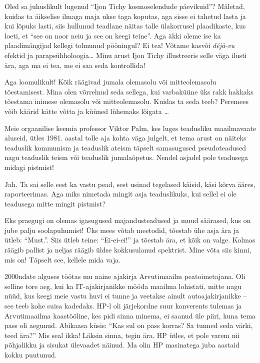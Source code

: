 Oled sa juhuslikult lugenud \enquote{Ijon Tichy kosmoselendude 
päevikuid}? Mäletad, 
kuidas ta äikselise ilmaga maja ukse taga koputas, aga sisse ei tahetud lasta ja kui 
lõpuks lasti, siis hullunud teadlane näitas talle ülakorrusel 
plaadikaste, kus loeti, et \enquote{see on noor neiu ja see on keegi teine}. 
Aga äkki oleme ise ka plaadimängijad kellegi tolmunud pööningul? Ei tea! Võtame kasvõi
\emph{déjà-vu} efektid ja parapsühholoogia\ldots{ }Minu arust Ijon Tichy illustreeris selle väga ilusti 
ära, aga ma ei tea, me ei saa seda kontrollida! 


Aga loomulikult! Kõik räägivad jumala olemasolu või
mitteolemasolu tõestamisest. Mina olen võrrelnud seda sellega, kui varbaküüne 
üks rakk hakkaks tõestama inimese olemasolu või mitteolemasolu. Kuidas ta seda 
teeb? Peremees võib käärid kätte võtta ja küüned lühemaks lõigata \ldots

Meie orgaanilise keemia professor Viktor Palm, kes
luges teadusliku maailmavaate aluseid, ütles 1981. aastal tolle aja kohta väga julgelt, et tema arust on näiteks teaduslik kommunism ja teaduslik 
ateism täpselt samasugused pseudoteadused nagu teaduslik teism või teaduslik 
jumalaõpetus. Nendel asjadel pole teadusega midagi pistmist!


Jah. Ta sai selle eest ka vastu pead, sest usinad tegelased käisid, käsi kõrva ääres, raporteerimas. Aga miks nimetada mingit asja 
teaduslikuks, kui sellel ei ole teadusega mitte mingit pistmist?


Eks praegugi on olemas igasugused majandusteadused ja muud säärased, kus on
jube palju soolapuhumist! Üks mees võtab meetodid, tõestab ühe 
asja ära ja ütleb: \enquote{Must.}. Siis ütleb teine: \enquote{Ei-ei-ei!} ja tõestab 
ära, et kõik on valge. Kolmas räägib pallist ja neljas räägib üldse kokkusulanud spektrist. Mine võta siis kinni, mis on! Täpselt see, kellele mida vaja.


2000ndate alguses töötas mu naine ajakirja 
Arvutimaailm peatoimetajana. Oli selline tore aeg, kui 
ka IT-ajakirjanikke mööda maailma lohistati, mitte nagu nüüd, kus keegi meie 
vastu huvi ei tunne ja veetakse ainult autoajakirjanikke -- see teeb kohe suisa 
kadedaks. HP-l oli järjekordne suur konverents tulemas ja 
Arvutimaailma kaastööline, kes pidi sinna minema, ei saanud üle piiri, kuna tema pass oli aegunud. Abikaasa küsis: \enquote{Kas sul on pass korras? Sa tunned 
seda värki, teed ära?} Mis seal ikka! Läksin sinna, tegin ära. HP ütles, et pole varem nii
põhjalikku ja sisukat ülevaadet näinud. Ma olin HP masinatega 
juba aastaid kokku puutunud. 

